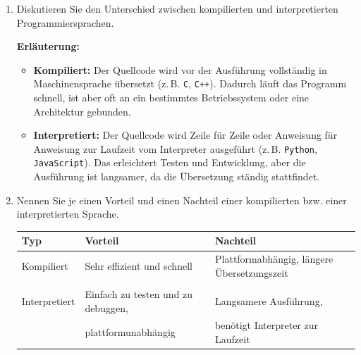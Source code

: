 \documentclass[12pt]{scrartcl}
\begin{document}


\begin{enumerate}
    \item Diskutieren Sie den Unterschied zwischen kompilierten und interpretierten Programmiersprachen.

        \textbf{Erläuterung:}

        \begin{itemize}
            \item \textbf{Kompiliert:} Der Quellcode wird vor der Ausführung vollständig in Maschinensprache übersetzt (z.\,B. \texttt{C}, \texttt{C++}). Dadurch läuft das Programm schnell, ist aber oft an ein bestimmtes Betriebssystem oder eine Architektur gebunden.
    
            \item \textbf{Interpretiert:} Der Quellcode wird Zeile für Zeile oder Anweisung für Anweisung zur Laufzeit vom Interpreter ausgeführt (z.\,B. \texttt{Python}, \texttt{JavaScript}). Das erleichtert Testen und Entwicklung, aber die Ausführung ist langsamer, da die Übersetzung ständig stattfindet.
        \end{itemize}

   

    \item Nennen Sie je einen Vorteil und einen Nachteil einer kompilierten bzw.
einer interpretierten Sprache.

    \begin{table}[H]
    \centering
    \begin{tabular}{@{}l|l|l@{}}
    \toprule
        Typ & Vorteil & Nachteil \\ \midrule
        Kompiliert & Sehr effizient und schnell & Plattformabhängig, längere Übersetzungszeit \\
        \\
        Interpretiert & Einfach zu testen und zu debuggen, & Langsamere Ausführung,\\
                      & plattformunabhängig & benötigt Interpreter zur Laufzeit \\
    \bottomrule
    \end{tabular}
    \end{table}
    
\end{enumerate}
\end{document}
